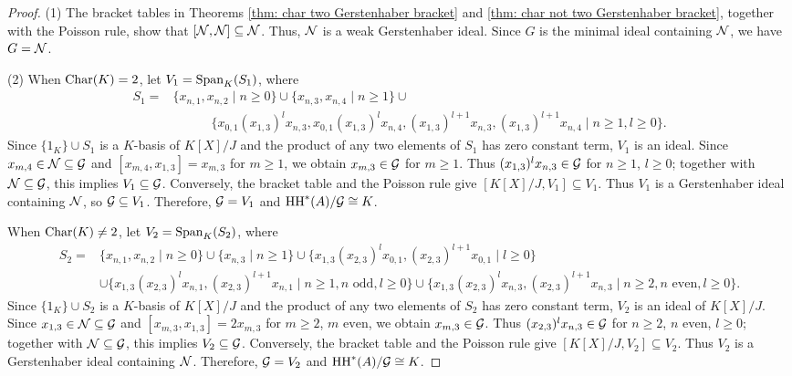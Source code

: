 \documentclass[10pt, reqno]{amsart}
\theoremstyle{definition}
\theoremstyle{remark}
\numberwithin{equation}{section}
\begin{document}
\begin{proof}
(1) The bracket tables in Theorems
\ref{thm:  char two Gerstenhaber bracket} and
\ref{thm:  char not two Gerstenhaber bracket}, together with the Poisson
rule, show that \([\mathcal{N},\mathcal{N}]\subseteq\mathcal{N}\). Thus, $\mathcal{N}$ is a weak Gerstenhaber ideal. Since $G$ is the minimal ideal containing $\mathcal{N}$, we have $G=\mathcal{N}$.

(2)  When $\mathrm{Char}(K)=2$, let $V_1=\mathrm{Span}_K(S_1)$, where 
\[\begin{aligned}
   S_1= &\{x_{n,1}, x_{n,2}\mid n \ge 0\}\cup \{x_{n,3}, x_{n,4}\mid n \ge 1\}\cup\\
&\quad\quad\quad\{x_{0,1}(x_{1,3})^l x_{n,3}, x_{0,1}(x_{1,3})^l x_{n,4}, (x_{1,3})^{l+1} x_{n,3},  (x_{1,3})^{l+1} x_{n,4} \mid n \ge 1, l \ge 0\}.
\end{aligned}
\]
Since $\{1_K\}\cup S_1$ is a $K$-basis of $K[X]/J$ and the product of any two elements of $S_1$ has zero constant term, $V_1$ is an ideal.  
Since $ x_{m,4} \in\mathcal{N}\subseteq \mathcal{G}$ and $[x_{m,4}, x_{1,3}] = x_{m,3}$ for $m\ge 1$, we obtain $x_{m,3} \in \mathcal{G}$ for $m\ge 1$. Thus $(x_{1,3})^l x_{n,3}\in \mathcal{G}$ for $n\ge 1$, $l\ge 0$; together with $\mathcal{N} \subseteq \mathcal{G}$, this implies $V_1\subseteq \mathcal{G}$. 
Conversely,  the bracket table and the Poisson rule give $[K[X]/J,V_1]\subseteq V_1$. Thus $V_1$ is a Gerstenhaber ideal containing $\mathcal{N}$, so $\mathcal{G} \subseteq V_1 $. Therefore, $\mathcal{G} = V_1 $ and  $\mathrm{HH}^*(A)/\mathcal{G} \cong K$.


    When $\mathrm{Char}(K)\neq 2$, let $V_2=\mathrm{Span}_K(S_2)$, where
\[\begin{aligned}
    S_2=&\{x_{n,1}, x_{n,2}\mid n \ge 0\}\cup \{x_{n,3}\mid n \ge 1\}
\cup\{x_{1,3}(x_{2,3})^lx_{0,1}, (x_{2,3})^{l+1}x_{0,1}\mid l\ge 0\}\\
&\cup \{x_{1,3}(x_{2,3})^l x_{n,1},  (x_{2,3})^{l+1} x_{n,1} \mid n \ge 1, n\text{ odd}, l \ge 0\} \cup \{x_{1,3}(x_{2,3})^l x_{n,3},  (x_{2,3})^{l+1} x_{n,3} \mid n \ge 2, n\text{ even}, l \ge 0\}.
\end{aligned}
\]
Since $\{1_K\}\cup S_2$ is a $K$-basis of $K[X]/J$ and the product of any two elements of $S_2$ has zero constant term, $V_2$ is an ideal of $K[X]/J$.
Since $x_{1,3}\in\mathcal{N} \subseteq \mathcal{G}$ and $[x_{m,3}, x_{1,3}]= 2x_{m,3}$ for $m\ge 2$, $m \text{ even}$, we obtain $x_{m,3}\in \mathcal{G}$. Thus $(x_{2,3})^l x_{n,3}\in \mathcal{G}$ for $n \ge 2$, $n\text{ even}$, $l \ge 0$; together with $\mathcal{N} \subseteq \mathcal{G}$, this implies $V_2\subseteq \mathcal{G}$. 
Conversely,  the bracket table and the Poisson rule give $[K[X]/J,V_2]\subseteq V_2$. Thus $V_2$ is a Gerstenhaber ideal containing $\mathcal{N}$. Therefore, $\mathcal{G}=V_2$ and $\mathrm{HH}^*(A)/\mathcal{G} \cong K$.
\end{proof}
\end{document}
